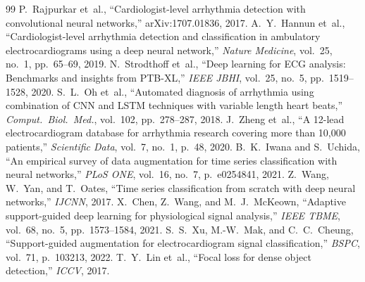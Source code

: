 \documentclass[conference]{IEEEtran}
\begin{document}

\begin{thebibliography}{99}
 P.~Rajpurkar et~al., ``Cardiologist-level
   arrhythmia detection with convolutional neural networks,''
   arXiv:1707.01836, 2017.
 A.~Y.~Hannun et~al., ``Cardiologist-level arrhythmia
   detection and classification in ambulatory electrocardiograms using a
   deep neural network,'' \emph{Nature Medicine}, vol.~25, no.~1,
   pp.~65--69, 2019.
 N.~Strodthoff et~al., ``Deep learning for ECG
   analysis: Benchmarks and insights from PTB-XL,''
   \emph{IEEE JBHI}, vol.~25, no.~5, pp.~1519--1528, 2020.
 S.~L.~Oh et~al., ``Automated diagnosis of arrhythmia
   using combination of CNN and LSTM techniques with variable length
   heart beats,'' \emph{Comput.~Biol.~Med.}, vol.~102, pp.~278--287, 2018.
 J.~Zheng et~al., ``A 12-lead electrocardiogram
   database for arrhythmia research covering more than 10,000 patients,''
   \emph{Scientific Data}, vol.~7, no.~1, p.~48, 2020.
 B.~K.~Iwana and S.~Uchida, ``An empirical survey of
   data augmentation for time series classification with neural
   networks,'' \emph{PLoS ONE}, vol.~16, no.~7, p.~e0254841, 2021.
 Z.~Wang, W.~Yan, and T.~Oates, ``Time series
   classification from scratch with deep neural networks,''
   \emph{IJCNN}, 2017.
 X.~Chen, Z.~Wang, and M.~J.~McKeown, ``Adaptive
   support-guided deep learning for physiological signal analysis,''
   \emph{IEEE TBME}, vol.~68, no.~5, pp.~1573--1584, 2021.
 S.~S.~Xu, M.-W.~Mak, and C.~C.~Cheung, ``Support-guided
   augmentation for electrocardiogram signal classification,''
   \emph{BSPC}, vol.~71, p.~103213, 2022.
 T.~Y.~Lin et~al., ``Focal loss for dense object
   detection,'' \emph{ICCV}, 2017.
\end{thebibliography}
\end{document}
